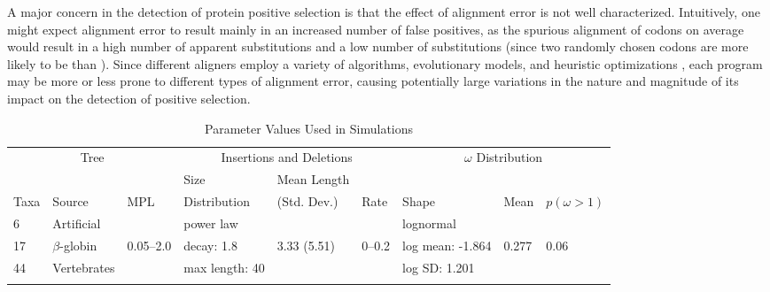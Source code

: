 A major concern in the detection of protein positive selection is that
the effect of alignment error is not well characterized. Intuitively,
one might expect alignment error to result mainly in an increased
number of false positives, as the spurious alignment of \nh codons on
average would result in a high number of apparent \nsyn substitutions
and a low number of \syn substitutions (since two randomly chosen
codons are more likely to be \nsyn than \syn).    Since different aligners employ a variety of
algorithms, evolutionary models, and heuristic optimizations
\citep{Notredame2007Recent}, each program may be more or less prone to
different types of alignment error, causing potentially large
variations in the nature and magnitude of its impact on the detection
of positive selection. 

\begin{table}
\centering
\caption{Parameter Values Used in Simulations}
\begin{threeparttable}
\footnotesize
\begin{tabular}{lllllllll}
\toprule
 \multicolumn{3}{c}{Tree} & \multicolumn{3}{c}{Insertions and Deletions} & \multicolumn{3}{c}{$\omega$ Distribution} \\
\cmidrule(r){1-3} \cmidrule(r){4-6} \cmidrule(r){7-9}
 & & & Size & Mean Length & & & & \\
Taxa & Source & MPL & Distribution & (Std. Dev.) & Rate & Shape & Mean & $p (\omega>1)$ \\
\midrule
6 & Artificial & & power law & & & lognormal & & \\
17 & $\beta$-globin & 0.05--2.0 & decay: 1.8 & 3.33 (5.51) & 0--0.2 & log mean: -1.864 & 0.277 & 0.06 \\
44 & Vertebrates & & max length: 40 & & &  log SD: 1.201 & & \\
\bottomrule
\label{table_1}
\end{tabular}
\end{threeparttable}
\end{table}

